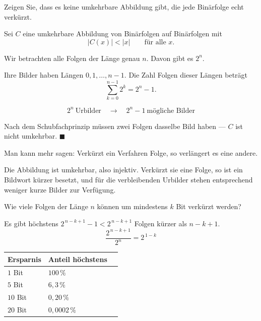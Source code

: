 \begin{aufgabe}
Zeigen Sie, dass es keine umkehrbare Abbildung gibt, die jede Binärfolge echt verkürzt.

\loesung
{}
Sei $C$ eine umkehrbare Abbildung von Binärfolgen auf Binärfolgen mit
\[ |C(x)| < |x| \qquad\text{für alle } x . \]

Wir betrachten alle Folgen der Länge genau $n$. Davon gibt es $2^{n}$.

Ihre Bilder haben Längen $0,1,\ldots,n-1$. Die Zahl  Folgen dieser Längen beträgt
\[ \sum_{k=0}^{n-1} 2^{k} = 2^{n}-1 . \]

\[ 2^{n} \ \text{Urbilder} \quad\longrightarrow\quad 2^{n}-1 \ \text{mögliche Bilder} \]

Nach dem Schubfachprinzip müssen zwei Folgen dasselbe Bild haben --- $C$ ist nicht umkehrbar. $\blacksquare$

Man kann mehr sagen: Verkürzt ein Verfahren  Folge, so verlängert es eine andere.

 Die Abbildung ist umkehrbar, also injektiv. Verkürzt sie eine Folge, so ist ein Bildwort kürzer besetzt, und für die verbleibenden Urbilder stehen entsprechend weniger kurze Bilder zur Verfügung.

Wie viele Folgen der Länge $n$ können um mindestens $k$ Bit verkürzt werden?

Es gibt höchstens $2^{\,n-k+1}-1 < 2^{\,n-k+1}$ Folgen kürzer als $n-k+1$.
\[ \frac{2^{\,n-k+1}}{2^{n}} = 2^{\,1-k} \]

\begin{center}
\renewcommand{\arraystretch}{1.46}
\begin{tabular}{@{}P{2.4cm}P{2.6cm}P{2.4cm}@{}}
\toprule
\textbf{Ersparnis} & \textbf{Anteil höchstens} & \\
\midrule
$1$ Bit & $100\,\%$ & \\
$5$ Bit & $6{,}3\,\%$ & \\
$10$ Bit & $0{,}20\,\%$ & \\
$20$ Bit & $0{,}0002\,\%$ & \\
\bottomrule
\end{tabular}
\end{center}


\end{aufgabe}
